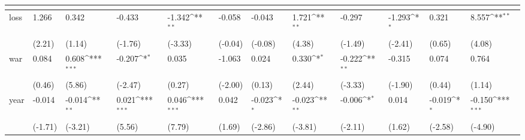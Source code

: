 \def\sym#1{\ifmmode^{#1}\else\(^{#1}\)\fi}
\begin{tabular}{p{1.5cm} p{2cm} p{1.7cm} p{1.7cm} p{1.7cm} p{1.7cm} p{1.7cm} p{1.7cm} p{1.7cm} p{1.7cm} p{1.7cm} p{1.7cm}}
                &&&&&&&&&&&\\
\hline
loss            &    1.266         &    0.342         &   -0.433         &   -1.342\sym{**} &   -0.058         &   -0.043         &    1.721\sym{**} &   -0.297         &   -1.293\sym{*}  &    0.321         &    8.557\sym{**} \\
                &   (2.21)         &   (1.14)         &  (-1.76)         &  (-3.33)         &  (-0.04)         &  (-0.08)         &   (4.38)         &  (-1.49)         &  (-2.41)         &   (0.65)         &   (4.08)         \\
war             &    0.084         &    0.608\sym{***}&   -0.207\sym{*}  &    0.035         &   -1.063         &    0.024         &    0.330\sym{*}  &   -0.222\sym{**} &   -0.315         &    0.074         &    0.764         \\
                &   (0.46)         &   (5.86)         &  (-2.47)         &   (0.27)         &  (-2.00)         &   (0.13)         &   (2.44)         &  (-3.33)         &  (-1.90)         &   (0.44)         &   (1.14)         \\
year            &   -0.014         &   -0.014\sym{**} &    0.021\sym{***}&    0.046\sym{***}&    0.042         &   -0.023\sym{*}  &   -0.023\sym{**} &   -0.006\sym{*}  &    0.014         &   -0.019\sym{*}  &   -0.150\sym{***}\\
                &  (-1.71)         &  (-3.21)         &   (5.56)         &   (7.79)         &   (1.69)         &  (-2.86)         &  (-3.81)         &  (-2.11)         &   (1.62)         &  (-2.58)         &  (-4.90)         \\
\end{tabular}
